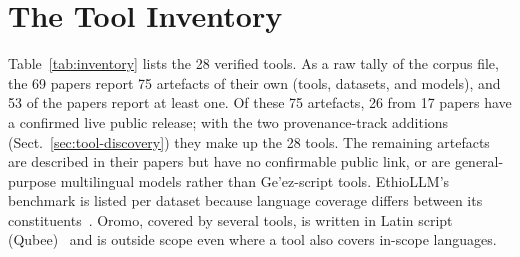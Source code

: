 \documentclass[runningheads]{llncs}
\begin{document}
\section{The Tool Inventory}\label{sec:inventory}

Table~\ref{tab:inventory} lists the 28 verified tools. As a raw tally of the corpus file, the 69 papers report 75 artefacts of their own (tools, datasets, and models), and 53 of the papers report at least one. Of these 75 artefacts, 26 from 17 papers have a confirmed live public release; with the two provenance-track additions (Sect.~\ref{sec:tool-discovery}) they make up the 28 tools. The remaining artefacts are described in their papers but have no confirmable public link, or are general-purpose multilingual models rather than Ge'ez-script tools. EthioLLM's benchmark is listed per dataset because language coverage differs between its constituents~\cite{tonja_ethiollm_2024}. Oromo, covered by several tools, is written in Latin script (Qubee)~\cite{tegegne_qubee_2016} and is outside scope even where a tool also covers in-scope languages.
\end{document}
